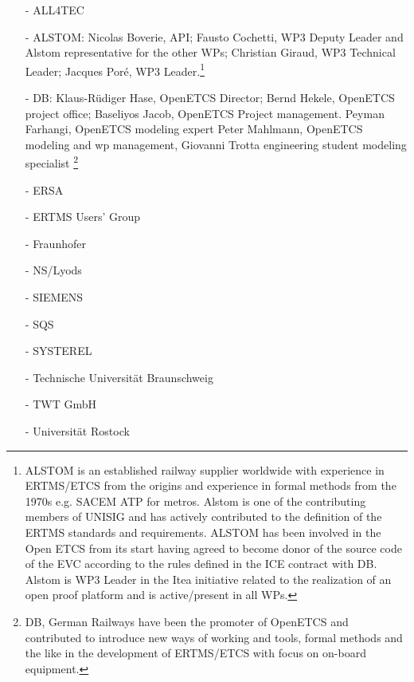 \documentclass{template/openetcs_report}
\begin{document}
\begin{itemize}
\item [-]ALL4TEC
\item [-]ALSTOM: Nicolas Boverie, API;
Fausto Cochetti, WP3 Deputy Leader and Alstom representative for the other WPs;
Christian Giraud, WP3 Technical Leader;
Jacques Por\'e, WP3 Leader.\footnote{
ALSTOM is an established railway supplier worldwide with experience in ERTMS/ETCS from the origins and experience in formal methods from the 1970s e.g. SACEM ATP for metros. Alstom is one of the contributing members of UNISIG and has actively contributed to the definition of the ERTMS standards and requirements.
ALSTOM has been involved in the Open ETCS from its start having agreed to become donor of the source code of the EVC according to the rules defined in the ICE contract with DB. Alstom is WP3 Leader in the Itea initiative related to the realization of an open proof platform and is active/present in all WPs. }
\item [-]DB: Klaus-R\"udiger Hase, OpenETCS Director; Bernd Hekele, OpenETCS project office;
Baseliyos Jacob, OpenETCS Project management.
Peyman Farhangi, OpenETCS modeling expert
Peter Mahlmann, OpenETCS modeling and wp management, Giovanni Trotta engineering student modeling specialist
\footnote{
DB, German Railways have been the promoter of OpenETCS and contributed to introduce new ways of working and tools, formal methods and the like in the development of ERTMS/ETCS with focus on on-board equipment.}
\item [-]ERSA
\item [-]ERTMS Users’ Group
\item [-]Fraunhofer
\item [-]NS/Lyods
\item [-]SIEMENS
\item [-]SQS
\item [-]SYSTEREL
\item [-]Technische Universit\"at Braunschweig
\item [-]TWT GmbH
\item [-] Universit\"at Rostock
\end{itemize}
\end{document}
